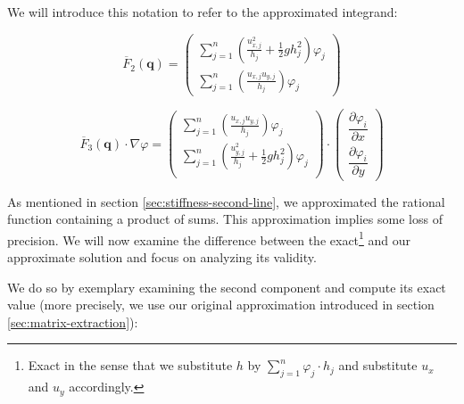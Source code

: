 \documentclass{article}
\newcommand{\pd}[2]{\dfrac{\partial #1}{\partial #2}}
\renewcommand{\phi}{\varphi}
\begin{document}
We will introduce this notation to refer to the approximated integrand:

\begin{equation}
  \label{eq:point-wise-approx-result-second-line}
  \overline{F}_2(\mathbf{q}) %
  =
  \begin{pmatrix}
    \sum_{j=1}^n \left(\frac{u_{x,j}^2}{h_j} + \frac{1}{2} g h_j^2\right) \phi_j \\
    \sum_{j=1}^n \left(\frac{u_{x,j} u_{y,j}}{h_j}\right) \phi_j
  \end{pmatrix}
\end{equation}

\begin{equation}
  \label{eq:point-wise-approx-result-third-line}
  \overline{F}_3(\mathbf{q}) \cdot \nabla \phi =
  \begin{pmatrix}
    \sum_{j=1}^n \left(\frac{u_{x,j} u_{y,j}}{h_j}\right) \phi_j \\
    \sum_{j=1}^n \left(\frac{u_{y,j}^2}{h_j} + \frac{1}{2} g h_j^2\right) \phi_j \\
  \end{pmatrix}
  \cdot
  \begin{pmatrix}
    \pd{\phi_i}{x} \\
    \pd{\phi_i}{y}
  \end{pmatrix}
\end{equation}

As mentioned in section \ref{sec:stiffness-second-line}, we approximated the rational function containing a product of sums. This approximation implies some loss of precision. We will now examine the difference between the exact\footnote{Exact in the sense that we substitute $h$ by $\sum_{j=1}^n \phi_j \cdot h_j$ and substitute $u_x$ and $u_y$ accordingly.} and our approximate solution and focus on analyzing its validity.

We do so by exemplary examining the second component and compute its exact value (more precisely, we use our original approximation introduced in section \ref{sec:matrix-extraction}):
\end{document}
